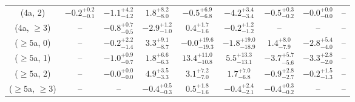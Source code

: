 \begin{table}[h!]
{\begin{tabular}{ccccccccc}
	(4a, 2) & $-0.2^{+ 0.2 }_{- 0.1 }$ & $-1.1^{+ 4.2 }_{- 4.2 }$ & $1.8^{+ 8.2 }_{- 8.0 }$ & $-0.5^{+ 6.9 }_{- 6.8 }$ & $-4.2^{+ 3.4 }_{- 3.4 }$ & $-0.5^{+ 0.3 }_{- 0.2 }$ & $-0.0^{+ 0.0 }_{- 0.0 }$ & -- \\[0.5ex] 
	(4a, $\ge3$) & -- & $-0.8^{+ 0.7 }_{- 0.5 }$ & $-2.9^{+ 1.2 }_{- 1.0 }$ & $0.4^{+ 1.7 }_{- 1.6 }$ & $-0.2^{+ 1.2 }_{- 1.2 }$ & -- & -- & -- \\[0.5ex] 
	($\ge5$a, 0) & -- & $-0.2^{+ 2.2 }_{- 1.4 }$ & $3.3^{+ 9.1 }_{- 8.7 }$ & $-0.0^{+ 19.6 }_{- 19.3 }$ & $-1.8^{+ 19.0 }_{- 18.9 }$ & $1.4^{+ 8.0 }_{- 7.9 }$ & $-2.8^{+ 5.4 }_{- 4.0 }$ & -- \\[0.5ex] 
	($\ge5$a, 1) & -- & $-1.0^{+ 0.9 }_{- 0.7 }$ & $1.8^{+ 6.6 }_{- 6.3 }$ & $13.4^{+ 11.0 }_{- 10.8 }$ & $5.5^{+ 13.3 }_{- 13.1 }$ & $-3.7^{+ 5.7 }_{- 5.6 }$ & $-3.3^{+ 2.8 }_{- 2.0 }$ & -- \\[0.5ex] 
	($\ge5$a, 2) & -- & $-0.0^{+ 0.0 }_{- 0.0 }$ & $4.9^{+ 3.5 }_{- 3.3 }$ & $3.1^{+ 7.2 }_{- 7.0 }$ & $1.7^{+ 7.0 }_{- 6.8 }$ & $-0.9^{+ 2.8 }_{- 2.7 }$ & $-0.2^{+ 1.5 }_{- 1.3 }$ & -- \\[0.5ex] 
	($\ge5$a, $\ge3$) & -- & -- & $-0.4^{+ 0.5 }_{- 0.3 }$ & $0.5^{+ 1.8 }_{- 1.6 }$ & $-0.4^{+ 2.4 }_{- 2.1 }$ & $-0.4^{+ 0.3 }_{- 0.2 }$ & -- & -- \\[0.5ex] 
	\hline
	\hline
\end{tabular}}
\end{table}
